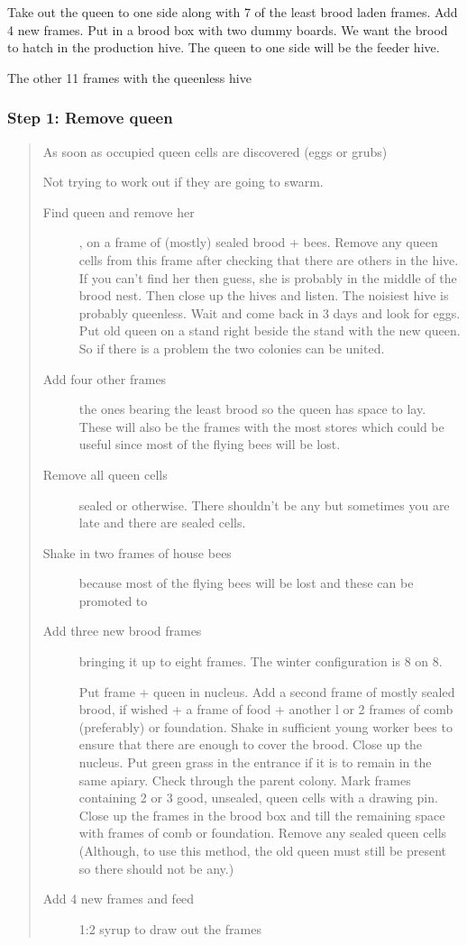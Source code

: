Take out the queen to one side along with 7 of the least brood laden frames.  
Add 4 new frames.
Put in a brood box with two dummy boards.
We want the brood to hatch in the production hive.
The queen to one side will be the feeder hive.

The other 11 frames with the queenless hive

\subsubsection*{Step 1: Remove queen}


\begin{quotation}
As soon as occupied queen cells are discovered (eggs or grubs)

Not trying to work out if they are going to swarm.
\begin{description}
  \item[Find queen and remove her], on a frame of (mostly) sealed brood + bees. Remove any queen cells from this frame after checking that there are others in the hive.
	If you can't find her  then guess, she is probably in the middle of the brood nest.
	Then close up the hives and listen.  The noisiest hive is probably queenless.
	Wait and come back in 3 days and look for eggs.
	Put old queen on a stand right beside the stand with the new queen.
	So if there is a problem the two colonies can be united.
  \item[Add four other frames] the ones bearing the least brood so the queen has space to lay.
	These will also be the frames with the most stores which could be useful since most of the flying bees will be lost.
  \item[Remove all queen cells] sealed or otherwise.  There shouldn't be any but sometimes you are late and there are sealed cells.
  \item[Shake in two frames of house bees] because most of the flying bees will be lost and these can be promoted to 
  \item[Add three new brood frames] bringing it up to eight frames.  The winter configuration is 8 on 8.
  
  
Put frame + queen in nucleus.
Add a second frame of mostly sealed brood, if wished + a frame of food + another l or 2
frames of comb (preferably) or foundation.
Shake in sufficient young worker bees to ensure that there are enough to cover the brood.
Close up the nucleus. Put green grass in the entrance if it is to remain in the same apiary.
Check through the parent colony.  Mark frames containing 2 or 3 good, unsealed, queen cells with a drawing pin.
Close up the frames in the brood box and till the remaining space with frames of comb or foundation.
	Remove any sealed queen cells (Although, to use this method, the old queen must still be present so there should not be any.)
  \item[Add 4 new frames and feed] 1:2 syrup to draw out the frames
 \end{description}
\end{quotation}
 
